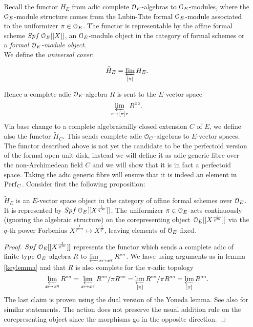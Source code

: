 Recall the functor $H_E$ from adic complete $\mathcal{O}_E$-algebras to $\mathcal{O}_E$-modules, where the $\mathcal{O}_E$-module structure comes from the Lubin-Tate formal $\mathcal{O}_E$-module
associated to the uniformizer $\pi\in\mathcal{O}_E$. 
The functor is representable by the affine formal scheme ${Spf{\:\mathcal{O}_E[[X]]}}$, an $\mathcal{O}_E$-module object in the category of formal schemes or a \emph{formal $\mathcal{O}_E$-module object}.\\

We define the \emph{universal cover}:

\[\tilde{H}_E= \varprojlim_{[\pi]}H_E.\]

Hence a complete adic $\mathcal{O}_E$-algebra $R$ is sent to the $E$-vector space $$\varprojlim_{r\mapsto[\pi]r}R^{\circ\circ}.$$
Via base change to a complete algebraicailly closed extension $C$ of $E$, we define also the functor $\tilde{H}_{C}$.
This sends complete adic $\mathcal{O}_C$-algebras to $E$-vector spaces.\\

 The functor described above is not yet the candidate to be the perfectoid version of the formal open unit disk, instead we will define it as adic generic fibre over the non-Archimedean field $C$ and we will show that it is in fact a perfectoid space. Taking the adic generic fibre will ensure that it is indeed an element in $\mathrm{Perf}_{C}$. Consider first the following proposition: 


\begin{prop}\label{vobjprop}
$\tilde{H}_E$ is an $E$-vector space object in the category of affine formal schemes over $\mathcal{O}_E$.
It is represented by ${Spf{\:\mathcal{O}_E[[X^{\frac{1}{q^\infty}}]]}}$. The uniformizer $\pi\in\mathcal{O}_E$ acts continuously (ignoring the algebraic structure) on the corepresenting object $\mathcal{O}_E[[X^{\frac{1}{q^\infty}}]]$ via the $q$-th power Forbenius 
$X^{\frac{1}{q^{n+1}}}\mapsto X^{\frac{1}{q^n}}$, leaving elements of $\mathcal{O}_E$ fixed.
\end{prop}
\begin{proof}
${Spf{\:\mathcal{O}_E[[X^{\frac{1}{q^\infty}}]]}}$ represents the functor which sends a complete adic of finite type $\mathcal{O}_E$-algebra $R$ to $\varprojlim_{x\mapsto x^q}R^{\circ\circ}$.
We have using arguments as in lemma \ref{keylemma} and that $R$ is also complete for the $\pi$-adic topology
$$\varprojlim_{x\mapsto x^q}R^{\circ\circ} = \varprojlim_{x\mapsto x^q}R^{\circ\circ}/\pi R^{\circ\circ} = \varprojlim_{[\pi]}R^{\circ\circ}/\pi R^{\circ\circ} = \varprojlim_{[\pi]}R^{\circ\circ}.$$
The last claim is proven using the dual version of the Yoneda lemma. See also  \cite[section II.2.1]{FS2021} for similar statements. The action does not preserve the usual addition rule on the corepresenting object since the morphisms go in the opposite direction.
\end{proof}

